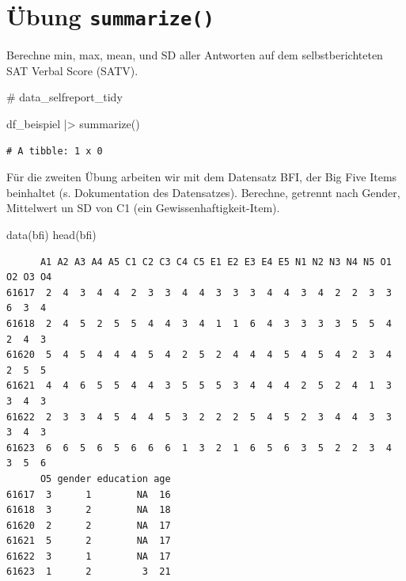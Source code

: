 \documentclass[
  letterpaper,
  DIV=11,
  numbers=noendperiod]{scrreprt}
\newenvironment{Shaded}{\begin{snugshade}}{\end{snugshade}}
\newcommand{\CommentTok}[1]{\textcolor[rgb]{0.37,0.37,0.37}{#1}}
\newcommand{\FunctionTok}[1]{\textcolor[rgb]{0.28,0.35,0.67}{#1}}
\newcommand{\NormalTok}[1]{\textcolor[rgb]{0.00,0.23,0.31}{#1}}
\newcommand{\SpecialCharTok}[1]{\textcolor[rgb]{0.37,0.37,0.37}{#1}}
\begin{document}
\chapter{\texorpdfstring{Übung
\texttt{summarize()}}{Übung summarize()}}\label{uxfcbung-summarize}

Berechne min, max, mean, und SD aller Antworten auf dem
selbstberichteten SAT Verbal Score (SATV).

\begin{Shaded}
\begin{Highlighting}[]
\CommentTok{\# data\_selfreport\_tidy}

\NormalTok{df\_beispiel }\SpecialCharTok{|\textgreater{}} 
  \FunctionTok{summarize}\NormalTok{()}
\end{Highlighting}
\end{Shaded}

\begin{verbatim}
# A tibble: 1 x 0
\end{verbatim}

Für die zweiten Übung arbeiten wir mit dem Datensatz BFI, der Big Five
Items beinhaltet (s. Dokumentation des Datensatzes). Berechne, getrennt
nach Gender, Mittelwert un SD von C1 (ein Gewissenhaftigkeit-Item).

\begin{Shaded}
\begin{Highlighting}[]
\FunctionTok{data}\NormalTok{(bfi)}
\FunctionTok{head}\NormalTok{(bfi)}
\end{Highlighting}
\end{Shaded}

\begin{verbatim}
      A1 A2 A3 A4 A5 C1 C2 C3 C4 C5 E1 E2 E3 E4 E5 N1 N2 N3 N4 N5 O1 O2 O3 O4
61617  2  4  3  4  4  2  3  3  4  4  3  3  3  4  4  3  4  2  2  3  3  6  3  4
61618  2  4  5  2  5  5  4  4  3  4  1  1  6  4  3  3  3  3  5  5  4  2  4  3
61620  5  4  5  4  4  4  5  4  2  5  2  4  4  4  5  4  5  4  2  3  4  2  5  5
61621  4  4  6  5  5  4  4  3  5  5  5  3  4  4  4  2  5  2  4  1  3  3  4  3
61622  2  3  3  4  5  4  4  5  3  2  2  2  5  4  5  2  3  4  4  3  3  3  4  3
61623  6  6  5  6  5  6  6  6  1  3  2  1  6  5  6  3  5  2  2  3  4  3  5  6
      O5 gender education age
61617  3      1        NA  16
61618  3      2        NA  18
61620  2      2        NA  17
61621  5      2        NA  17
61622  3      1        NA  17
61623  1      2         3  21
\end{verbatim}

\end{document}
